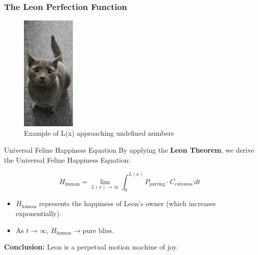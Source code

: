 \documentclass[compress]{beamer}
\begin{document}
\begin{frame}
\frametitle{The Leon Perfection Function}
\begin{center}
  \begin{figure}[h]
    \includegraphics[width=0.23\textwidth]{images/cuteness_leon.jpg} %
\caption{Example of L(x) approaching undefined numbers}
\label{fig:egypt_cat} %
  \end{figure}

\end{center}
\end{frame}

\begin{frame}{Universal Feline Happiness Equation}
    By applying the \textbf{Leon Theorem}, we derive the Universal Feline Happiness Equation:
    
    \begin{equation}
        H_{\text{human}} = \lim_{L(x) \to \infty} \int_{0}^{L(x)} P_{\text{purring}} \cdot C_{\text{cuteness}} \, dt
    \end{equation}

    \begin{itemize}
        \item \( H_{\text{human}} \) represents the happiness of Leon’s owner (which increases exponentially).
        \item As \( t \to \infty \), \( H_{\text{human}} \to \text{pure bliss} \).
    \end{itemize}

    \textbf{Conclusion:} Leon is a perpetual motion machine of joy.
\end{frame}
\end{document}
